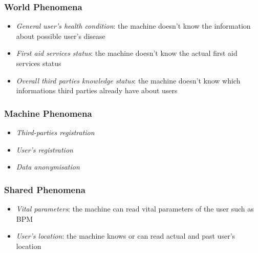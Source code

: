 \documentclass{article}
\begin{document}
\subsubsection{World Phenomena}
\begin{itemize}
	\item \textit{General user’s health condition}: the machine doesn’t know the information about possible user’s disease
	\item \textit{First aid services status}: the machine doesn’t know the actual first aid services status
	\item \textit{Overall third parties knowledge status}: the machine doesn’t know which informations third parties already have about users
\end{itemize}

\subsubsection{Machine Phenomena}
\begin{itemize}
	\item \textit{Third-parties registration}
	\item \textit{User's registration}
	\item \textit{Data anonymisation}
\end{itemize}

\subsubsection{Shared Phenomena}
\begin{itemize}
	\item \textit{Vital parameters}: the machine can read vital parameters of the user such as BPM
	\item \textit{User's location}: the machine knows or can read actual and past user’s location
\end{itemize}

\newpage
\end{document}
